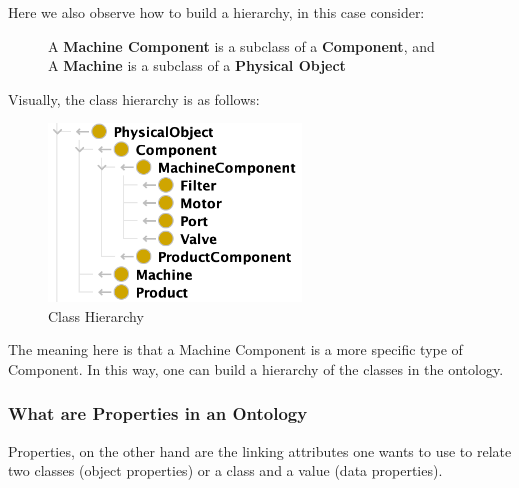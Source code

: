 \documentclass{guideline/sty/rapport}
\begin{document}
Here we also observe how to build a hierarchy, in this case consider:

 \begin{SampleEnv}
    \begin{figure}[H]
    \begin{mdframed}[backgroundcolor=mediumtealblue!8, linecolor=mediumtealblue]
        \begin{minipage}[t]{1\linewidth}
        A \textbf{Machine Component} is a subclass of a \textbf{Component}, and
        \\
        A \textbf{Machine} is a subclass of a \textbf{Physical Object}
        \end{minipage}
     \end{mdframed}
    \end{figure}
    \label{fig:exampleHierarchy}
    \end{SampleEnv}

\newpage
Visually, the class hierarchy is as follows:
    
  \begin{figure}[H]
        \centering
          \includegraphics[width=0.6\textwidth]{images/hierarchy.png}
          \caption{Class Hierarchy}
    \label{fig:examplehiearchyclasses}
    \end{figure}

The meaning here is that a Machine Component is a more specific type of Component. In this way, one can build a hierarchy of the classes in the ontology.

\subsubsection{What are Properties in an Ontology}
\label{sec:propertiesontologies}

Properties, on the other hand are the linking attributes one wants to use to relate two classes (object properties) or a class and a value (data properties).
\end{document}
